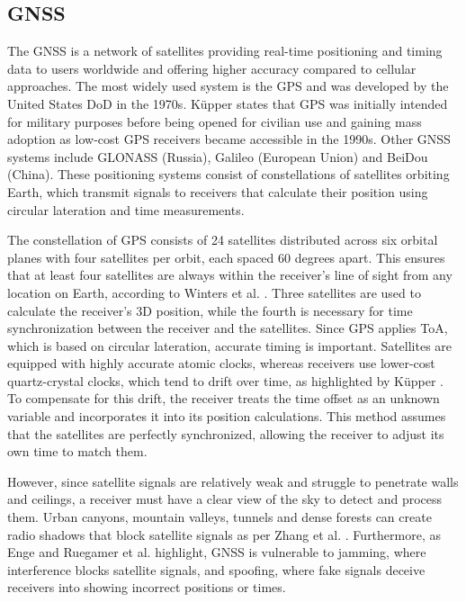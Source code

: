 \subsection{GNSS}
\label{sec:gnss}
The \acs{GNSS} is a network of satellites providing real-time positioning and timing data to users worldwide and offering higher accuracy compared to cellular approaches.
The most widely used system is the \ac{GPS} and was developed by the United States \ac{DoD} in the 1970s.
K\"upper \cite{kupper2005location} states that \acs{GPS} was initially intended for military purposes before being opened for civilian use and gaining mass adoption as low-cost GPS receivers became accessible in the 1990s.
Other GNSS systems include GLONASS (Russia), Galileo (European Union) and BeiDou (China). 
These positioning systems consist of constellations of satellites orbiting Earth, which transmit signals to receivers that calculate their position using circular lateration and time measurements.

The constellation of \acs{GPS} consists of 24 satellites distributed across six orbital planes with four satellites per orbit, each spaced 60 degrees apart. 
This ensures that at least four satellites are always within the receiver's line of sight from any location on Earth, according to Winters et al. \cite{winters2008travel}.  
Three satellites are used to calculate the receiver's 3D position, while the fourth is necessary for time synchronization between the receiver and the satellites. 
Since GPS applies \ac{ToA}, which is based on circular lateration, accurate timing is important. 
Satellites are equipped with highly accurate atomic clocks, whereas receivers use lower-cost quartz-crystal clocks, which tend to drift over time, as highlighted by K\"upper \cite{kupper2005location}. 
To compensate for this drift, the receiver treats the time offset as an unknown variable and incorporates it into its position calculations. 
This method assumes that the satellites are perfectly synchronized, allowing the receiver to adjust its own time to match them.  

However, since satellite signals are relatively weak and struggle to penetrate walls and ceilings, a receiver must have a clear view of the sky to detect and process them.
Urban canyons, mountain valleys, tunnels and dense forests can create radio shadows that block satellite signals as per Zhang et al. \cite{zhang2021gnss}. 
Furthermore, as Enge \cite{enge1994global} and Ruegamer et al. \cite{ruegamer2015jamming} highlight, \acs{GNSS} is vulnerable to jamming, where interference blocks satellite signals, and spoofing, where fake signals deceive receivers into showing incorrect positions or times.

